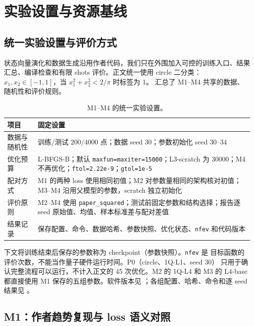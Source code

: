 \section{实验设置与资源基线}
\label{sec:experiments-setup-m1-m2}

\subsection{统一实验设置与评价方式}
\label{subsec:experiment-protocol}

状态向量演化和数据生成沿用作者代码，我们只在外围加入可控的训练入口、结果
汇总、编译检查和有限 shots 评价。正文统一使用 circle 二分类：
$x_1,x_2\in[-1,1]$，当 $x_1^2+x_2^2<2/\pi$ 时标签为 1。
汇总了 M1--M4 共享的数据、随机性和评价规则。

\begin{table}[htbp]
    \centering
    \caption{M1--M4 的统一实验设置。}
    \label{tab:m1-m2-protocol}
    \begin{tabular}{@{}p{}p{}@{}}
        \toprule
        项目 & 固定设置 \\
        \midrule
        数据与随机性 & 训练/测试 $200/4000$ 点；数据 seed 30；参数初始化 seed $30$--$34$ \\
        优化预算 & L-BFGS-B；默认 \texttt{maxfun=maxiter=15000}；L3-scratch 为 30000；M4 不再优化；\texttt{ftol=2.22e-9}；\texttt{gtol=1e-5} \\
        配对方式 & M1 的两种 loss 使用相同初值；M2 对参数量相同的架构核对初值；M3--M4 沿用父模型的参数，scratch 独立初始化 \\
        评价原则 & M2--M4 使用 \texttt{paper\_squared}；测试前固定参数和结构选择；报告逐 seed 原始值、均值、样本标准差与配对差值 \\
        结果记录 & 保存配置、命令、数据哈希、参数快照、优化状态、\texttt{nfev} 和代码版本 \\
        \bottomrule
    \end{tabular}
\end{table}

下文将训练结束后保存的参数称为 checkpoint（参数快照）。\texttt{nfev} 是
目标函数的评价次数，不能当作量子硬件运行时间。P0（circle、1Q-L1、seed 30）
只用于确认完整流程可以运行，不计入正文的 45 次优化。M2 的 1Q-L4 和 M3 的
L4-base 都直接使用 M1 保存的五组参数。软件版本见
；各组配置、哈希、命令和逐 seed 结果见
。

\subsection{M1：作者趋势复现与 loss 语义对照}
\label{subsec:m1-loss}


